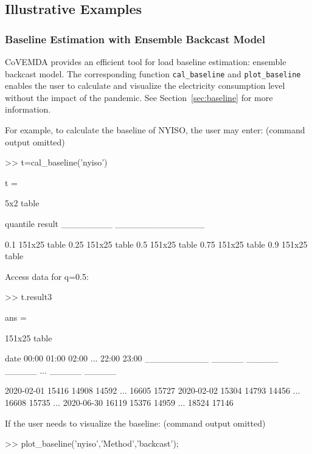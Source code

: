 \documentclass[10pt]{article}
\newcommand{\covemda}{CoVEMDA}
\numberwithin{equation}{section}
\numberwithin{table}{section}
\numberwithin{figure}{section}
\begin{document}
\clearpage
\subsection{Illustrative Examples}

\subsubsection{Baseline Estimation with Ensemble Backcast Model}\label{subsec:eg_baseline}

\covemda{} provides an efficient tool for load baseline estimation: ensemble backcast model. The corresponding function \verb!cal_baseline! and \verb!plot_baseline! enables the user to calculate and visualize the electricity consumption level without the impact of the pandemic. See Section~\ref{sec:baseline} for more information.

For example, to calculate the baseline of NYISO, the user may enter: (command output omitted)

\begin{Command}
>> t=cal_baseline('nyiso')

t =

  5x2 table

    quantile        result    
    ________    ______________

       0.1      {151x25 table}
      0.25      {151x25 table}
       0.5      {151x25 table}
      0.75      {151x25 table}
       0.9      {151x25 table}
\end{Command}

Access data for q=0.5:

\begin{Command}
>> t.result{3}

ans =

  151x25 table

       date       00:00    01:00    02:00    ...    22:00    23:00
    __________    _____    _____    _____    ...    _____    _____

    2020-02-01    15416    14908    14592    ...    16605    15727
    2020-02-02    15304    14793    14456    ...    16608    15735
    ...
    2020-06-30    16119    15376    14959    ...    18524    17146
\end{Command}

If the user needs to visualize the baseline: (command output omitted)

\begin{Command}
>> plot_baseline('nyiso','Method','backcast');
\end{Command}
\end{document}
